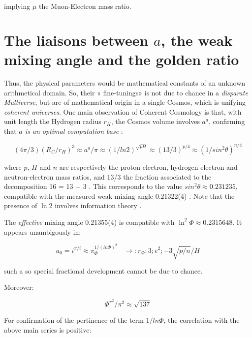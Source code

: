 \documentclass[a4paper,9pt]{article}
\begin{document}
implying $\mu$ the  Muon-Electron mass ratio. 

  
   

\section{The liaisons between $a$, the weak mixing angle and the golden ratio}

Thus, the physical parameters would be mathematical constants of an unknown arithmetical domain. So, their « fine-tunings» is not due to chance in a \textit {disparate Multiverse}, but are of mathematical origin in a single Cosmos, which is unifying \textit{coherent universes}. One main observation of Coherent Cosmology is that, with unit length the Hydrogen radius $r_H$, the Cosmos volume involves $a^a$, confirming that \textit{$a$ is an optimal computation base}  \cite{Sanchez}:

\begin{equation}
    (4\pi /3) (R_C/r_H)^3 \approx a^a/\pi \approx (1/ln2)^{\sqrt{pH}} \approx (13/3)^{p/4} \approx (1/sin^2\theta)^{n/4} 
\end{equation}

where $p$, $H$ and $n$ are respectively the proton-electron, hydrogen-electron and neutron-electron mass ratios, and 13/3 the fraction associated to the decomposition 16 = 13 + 3 \cite{Sanchez1}. This corresponds to the value $sin^2\theta \approx 0.231235$, compatible with the measured weak mixing angle 0.21322(4) \cite{Tanabashi}. Note that the presence of $\ln{2}$ involves information theory \cite{Shannon}. 


The \textit {effective} mixing angle 0.21355(4) \cite{Tanabashi} is compatible with $\ln^2{\Phi} \approx 0.2315648$. It appears unambigously in:

\begin{equation}
a_0 = i^{\pi/i} \approx \pi_{\Phi}^{1/(ln\Phi) ^2} ~~~~\rightarrow : \pi_{\Phi}: 3; e^2; -3\sqrt{p/n}/H
\end{equation}

such a so special fractional development cannot be due to chance. 


Moreover:

\begin{equation}
\Phi^{\pi^2}/\pi^2 \approx \sqrt{137}
\end{equation}

For confirmation of the pertinence of the term $1/ln\Phi$, the correlation with the above main series is positive:
\end{document}
